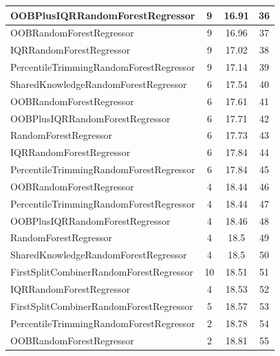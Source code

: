\begin{table}[h]
\centering
\begin{tabular}{|l|c|c|c|}
\hline
\textcolor[HTML]{ede15b}{OOBPlusIQRRandomForestRegressor} & 9 & 16.91 & 36 \\ \hline
\textcolor[HTML]{b33dc6}{OOBRandomForestRegressor} & 9 & 16.96 & 37 \\ \hline
\textcolor[HTML]{27aeef}{IQRRandomForestRegressor} & 9 & 17.02 & 38 \\ \hline
\textcolor[HTML]{f46a9b}{PercentileTrimmingRandomForestRegressor} & 9 & 17.14 & 39 \\ \hline
\textcolor[HTML]{ef9b20}{SharedKnowledgeRandomForestRegressor} & 6 & 17.54 & 40 \\ \hline
\textcolor[HTML]{b33dc6}{OOBRandomForestRegressor} & 6 & 17.61 & 41 \\ \hline
\textcolor[HTML]{ede15b}{OOBPlusIQRRandomForestRegressor} & 6 & 17.71 & 42 \\ \hline
\textcolor[HTML]{87bc45}{RandomForestRegressor} & 6 & 17.73 & 43 \\ \hline
\textcolor[HTML]{27aeef}{IQRRandomForestRegressor} & 6 & 17.84 & 44 \\ \hline
\textcolor[HTML]{f46a9b}{PercentileTrimmingRandomForestRegressor} & 6 & 17.84 & 45 \\ \hline
\textcolor[HTML]{b33dc6}{OOBRandomForestRegressor} & 4 & 18.44 & 46 \\ \hline
\textcolor[HTML]{f46a9b}{PercentileTrimmingRandomForestRegressor} & 4 & 18.44 & 47 \\ \hline
\textcolor[HTML]{ede15b}{OOBPlusIQRRandomForestRegressor} & 4 & 18.46 & 48 \\ \hline
\textcolor[HTML]{87bc45}{RandomForestRegressor} & 4 & 18.5 & 49 \\ \hline
\textcolor[HTML]{ef9b20}{SharedKnowledgeRandomForestRegressor} & 4 & 18.5 & 50 \\ \hline
\textcolor[HTML]{ea5545}{FirstSplitCombinerRandomForestRegressor} & 10 & 18.51 & 51 \\ \hline
\textcolor[HTML]{27aeef}{IQRRandomForestRegressor} & 4 & 18.53 & 52 \\ \hline
\textcolor[HTML]{ea5545}{FirstSplitCombinerRandomForestRegressor} & 5 & 18.57 & 53 \\ \hline
\textcolor[HTML]{f46a9b}{PercentileTrimmingRandomForestRegressor} & 2 & 18.78 & 54 \\ \hline
\textcolor[HTML]{b33dc6}{OOBRandomForestRegressor} & 2 & 18.81 & 55 \\ \hline

\end{tabular}
\end{table}
